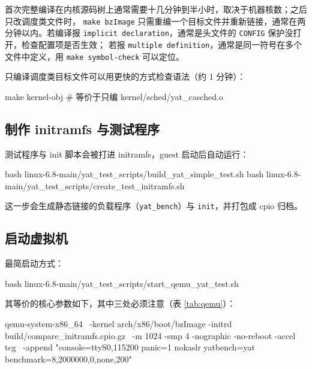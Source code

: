 \documentclass[11pt,a4paper]{article}
\newcommand{\code}[1]{\texttt{#1}}
\newenvironment{shell}{\Verbatim[fontsize=\small,frame=single,framesep=4pt]}{\endVerbatim}
\begin{document}
首次完整编译在内核源码树上通常需要十几分钟到半小时，取决于机器核数；之后只改调度类文件时，
\code{make bzImage} 只需重编一个目标文件并重新链接，通常在两分钟以内。若编译报
\code{implicit declaration}，通常是头文件的 \code{CONFIG} 保护没打开，检查配置项是否生效；
若报 \code{multiple definition}，通常是同一符号在多个文件中定义，用 \code{make symbol-check}
可以定位。

只编译调度类目标文件可以用更快的方式检查语法（约 1 分钟）：

\begin{shell}
make kernel-obj        # 等价于只编 kernel/sched/yat_casched.o
\end{shell}

\subsection{制作 initramfs 与测试程序}

测试程序与 init 脚本会被打进 initramfs，guest 启动后自动运行：

\begin{shell}
bash linux-6.8-main/yat_test_scripts/build_yat_simple_test.sh
bash linux-6.8-main/yat_test_scripts/create_test_initramfs.sh
\end{shell}

这一步会生成静态链接的负载程序（\code{yat\_bench}）与 \code{init}，并打包成 cpio 归档。

\subsection{启动虚拟机}

最简启动方式：

\begin{shell}
bash linux-6.8-main/yat_test_scripts/start_qemu_yat_test.sh
\end{shell}

其等价的核心参数如下，其中三处必须注意（表 \ref{tab:qemu}）：

\begin{shell}
qemu-system-x86_64 \
  -kernel arch/x86/boot/bzImage -initrd build/compare_initramfs.cpio.gz \
  -m 1024 -smp 4 -nographic -no-reboot -accel tcg \
  -append "console=ttyS0,115200 panic=1 nokaslr yatbench=yat benchmark=8,2000000,0,none,200"
\end{shell}
\end{document}
